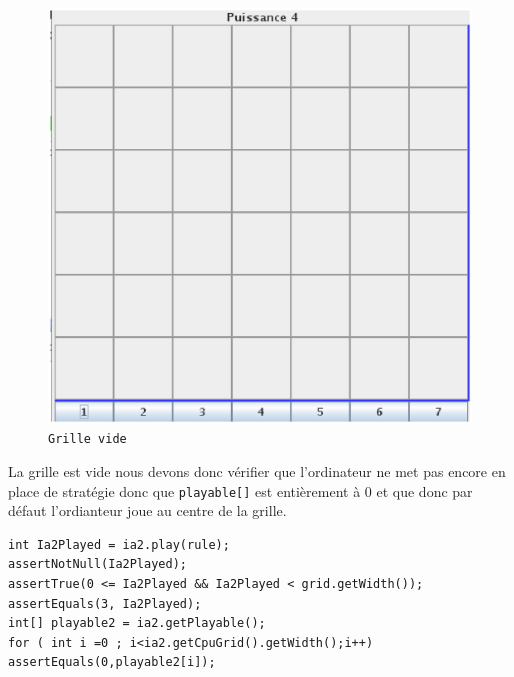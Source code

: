 \begin{figure}[H]
\begin{center}
  \includegraphics[scale=0.2]{nmfigempty}
  \caption{\texttt{Grille vide}}
\end{center}
\end{figure}

La grille est vide nous devons donc vérifier que l'ordinateur ne met pas encore en place de stratégie donc que 
\texttt{playable[]} est entièrement à 0 et que donc par défaut l'ordianteur joue au centre de la grille.


\begin{verbatim}
int Ia2Played = ia2.play(rule);
assertNotNull(Ia2Played);
assertTrue(0 <= Ia2Played && Ia2Played < grid.getWidth());
assertEquals(3, Ia2Played);
int[] playable2 = ia2.getPlayable();
for ( int i =0 ; i<ia2.getCpuGrid().getWidth();i++)
assertEquals(0,playable2[i]);
\end{verbatim}


